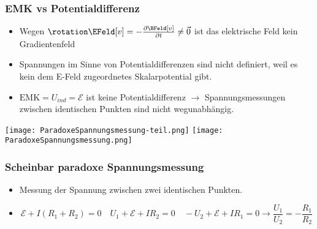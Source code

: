 \begin{frame}
  \frametitle{EMK vs Potentialdifferenz}
  \begin{itemize}[<+->]
  \item Wegen $\rotation \EFeld[v] = -\frac{\partial \BFeld[v]}{\partial t} \ne \vec{0}$ ist das elektrische Feld \alert{kein Gradientenfeld}
  \item Spannungen im Sinne von \alert{Potentialdifferenzen} sind \alert{nicht definiert}, weil es kein dem E-Feld zugeordnetes Skalarpotential gibt.
    \item $\text{EMK} = U_{ind}=\mathcal{E}$ ist \alert{keine Potentialdifferenz} $\to$ Spannungsmessungen zwischen identischen Punkten sind \alert{nicht wegunabhängig.}
    \end{itemize}\pause
    
  \texttt{[image: ParadoxeSpannungsmessung-teil.png]}\hspace*{1cm}\pause
  \texttt{[image: ParadoxeSpannungsmessung.png]}
\end{frame}

\begin{frame}
  \frametitle{Scheinbar paradoxe Spannungsmessung}
  \begin{itemize}[<+->]
  \item Messung der Spannung zwischen zwei identischen Punkten.
  \item
    $$
    \mathcal{E} + I (R_1+R_2)= 0 \quad U_1+\mathcal{E} + I R_2 = 0 \quad -U_2+\mathcal{E} + I R_1 = 0 \to \boxed{\frac{U_1}{U_2} = -\frac{R_1}{R_2}} 
    $$
  \end{itemize}
\end{frame}

